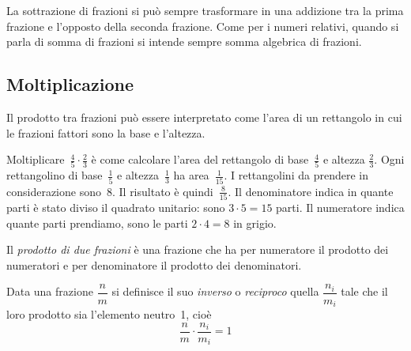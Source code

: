 La sottrazione di frazioni si può sempre trasformare in una addizione tra la prima frazione e
l'opposto della seconda frazione. Come per i numeri relativi, quando si parla di
somma di frazioni si intende sempre somma algebrica di frazioni.

\vspazio\ovalbox{\risolvii \ref{ese:3.45}, \ref{ese:3.46}, \ref{ese:3.47}, \ref{ese:3.48}, \ref{ese:3.49}, \ref{ese:3.50}}

\subsection{Moltiplicazione}
\begin{multicols}{2}
Il prodotto tra frazioni può essere interpretato come l'area di un rettangolo in cui
le frazioni fattori sono la base e l'altezza.

Moltiplicare~$\frac{4}{5}\cdot\frac{2}{3}$ è come calcolare l'area del rettangolo di base~$\frac{4}{5}$ e altezza
$\frac{2}{3}$. 
Ogni rettangolino di base~$\frac{1}{5}$ e altezza~$\frac{1}{3}$ ha area~$\frac{1}{15}$.
I rettangolini da prendere in considerazione sono~8. Il risultato è quindi~$\frac{8}{15}$. 
Il denominatore indica in quante parti è stato diviso il quadrato unitario: sono $3 \cdot 5=15$ parti.
Il numeratore indica quante parti prendiamo, sono le parti $2\cdot 4=8$ in grigio. 
\begin{center}
 
\end{center}
\end{multicols}

\begin{definizione}
Il \emph{prodotto di due frazioni} è una frazione che ha per numeratore il prodotto dei numeratori
e per denominatore il prodotto dei denominatori.
\end{definizione}

\begin{center}
 
\end{center}
\ovalbox{\risolvii \ref{ese:3.51}, \ref{ese:3.52}, \ref{ese:3.53}, \ref{ese:3.54}, \ref{ese:3.55}}

\begin{definizione}
Data una frazione $\dfrac{n}{m}$ si definisce il suo \emph{inverso} o \emph{reciproco} quella $\dfrac{n_i}{m_i}$ tale che il loro prodotto sia l'elemento neutro~1, cioè
\[\frac{n}{m} \cdot \frac{n_i}{m_i} = 1\]
\end{definizione}

